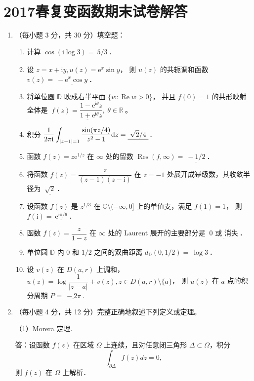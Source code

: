 \section{2017春复变函数期末试卷解答}
\begin{enumerate}
\item[一]（每小题 3 分，共 30 分）填空题：
\begin{enumerate}[label=(\arabic*)]
\item 计算 $\cos (\mathrm{i} \log 3)=\underline{\ 5 / 3\ }$．
\item 设 $z=x+\mathrm{i} y, u(z)=\mathrm{e}^{x} \sin y$，
则 $u(z)$ 的共轭调和函数 $v(z)=\underline{\ -\mathrm{e}^{x} \cos y\ }$．
\item 将单位圆 $\mathbb{D}$ 映成右半平面 $\{w: \operatorname{Re} w>0\}$，
并且 $f(0)=1$ 的共形映射全体是 $\underline{\ f(z)=\dfrac{1-\mathrm{e}^{\mathrm{i} \theta} z}{1+\mathrm{e}^{\mathrm{i} \theta} z},\ \theta \in \mathbb{R}\ }$。
\item 积分 $\displaystyle \frac{1}{2 \pi \mathrm{i}} \int_{|z-1|=1} \frac{\sin (\pi z/4)}{z^{2}-1} {\rm d} z=\underline{\ \sqrt{2}/4\ }$．
\item 函数 $f(z)=z \mathrm{e}^{1/z}$ 在 $\infty$ 处的留数 $\operatorname{Res}(f, \infty)=\underline{\ -1/2\ }$．
\item 将函数 $f(z)=\dfrac{z}{(z-1)(z-\mathrm{i})}$ 在 $z=-1$ 处展开成幂级数，其收敛半径为 $\underline{\ \sqrt{2}\ }$．
\item 设函数 $f(z)$ 是 $z^{1 / 3}$ 在 $\mathbb{C} \setminus (-\infty, 0]$ 上的单值支，满足 $f(1)=1$，
则 $f(\mathrm{i})=\underline{\ \mathrm{e}^{\mathrm{i}\pi/6}\ }$．
\item 函数 $f(z)=\dfrac{z}{1-z}$ 在 $\infty$ 处的 Laurent 展开的主要部分是 $\underline{\ 0\text{ 或 消失}\ }$．
\item 单位圆 $\mathbb{D}$ 内 $0$ 和 $1 / 2$ 之间的双曲距离 $d_{\mathbb{D}}(0,1 / 2)=\underline{\ \log 3\ }$．
\item 设 $v(z)$ 在 $D(a, r)$ 上调和，$u(z)=\log \dfrac{1}{|z-a|}+v(z), z \in D(a, r) \setminus \{a\}$，
则 $u(z)$ 在 $a$ 点的积分周期 $P=\underline{\ -2\pi\ }$.
\end{enumerate}

\item[二]（每小题 4 分，共 12 分）完整正确地叙述下列定义或定理。

（1）Morera 定理.

答：设函数 $f(z)$ 在区域 $\Omega$ 上连续，且对任意闭三角形 $\Delta \subset \Omega$，积分
$$\int_{\partial \Delta} f(z) dz=0,$$
则 $f(z)$ 在 $\Omega$ 上解析．


\end{enumerate}
